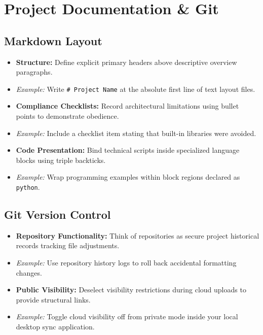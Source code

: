 \documentclass{article}
\begin{document}
\section{Project Documentation \& Git}

\subsection{Markdown Layout}
\begin{itemize}
    \item \textbf{Structure:} Define explicit primary headers above descriptive overview paragraphs.
    \item[] \textit{Example:} Write \texttt{\# Project Name} at the absolute first line of text layout files.
    \item \textbf{Compliance Checklists:} Record architectural limitations using bullet points to demonstrate obedience.
    \item[] \textit{Example:} Include a checklist item stating that built-in libraries were avoided.
    \item \textbf{Code Presentation:} Bind technical scripts inside specialized language blocks using triple backticks.
    \item[] \textit{Example:} Wrap programming examples within block regions declared as \texttt{\textasciigrave\textasciigrave\textasciigrave python}.
\end{itemize}

\subsection{Git Version Control}
\begin{itemize}
    \item \textbf{Repository Functionality:} Think of repositories as secure project historical records tracking file adjustments.
    \item[] \textit{Example:} Use repository history logs to roll back accidental formatting changes.
    \item \textbf{Public Visibility:} Deselect visibility restrictions during cloud uploads to provide structural links.
    \item[] \textit{Example:} Toggle cloud visibility off from private mode inside your local desktop sync application.
\end{itemize}
\end{document}
